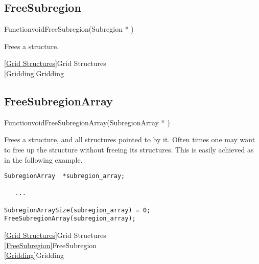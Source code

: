 \newpage
\subsection{FreeSubregion}
\label{FreeSubregion}


\begin{deftypefn}{Function}{void}{FreeSubregion}({Subregion *} )

\DESCRIPTION
Frees a  structure.

\SEEALSO
\vref{Grid Structures}{Grid Structures}\\
\vref{Gridding}{Gridding}

\end{deftypefn}


\newpage
\subsection{FreeSubregionArray}
\label{FreeSubregionArray}


\begin{deftypefn}{Function}{void}{FreeSubregionArray}({SubregionArray *} )

\DESCRIPTION
Frees a  structure, and all 
structures pointed to by it.
Often times one may want to free up the  structure
without freeing its  structures.
This is easily achieved as in the following example.

\EXAMPLE
\mbox{}
\begin{display}\begin{verbatim}
SubregionArray  *subregion_array;

   ...

SubregionArraySize(subregion_array) = 0;
FreeSubregionArray(subregion_array);
\end{verbatim}\end{display}

\SEEALSO
\vref{Grid Structures}{Grid Structures}\\
\vref{FreeSubregion}{FreeSubregion}\\
\vref{Gridding}{Gridding}

\end{deftypefn}

